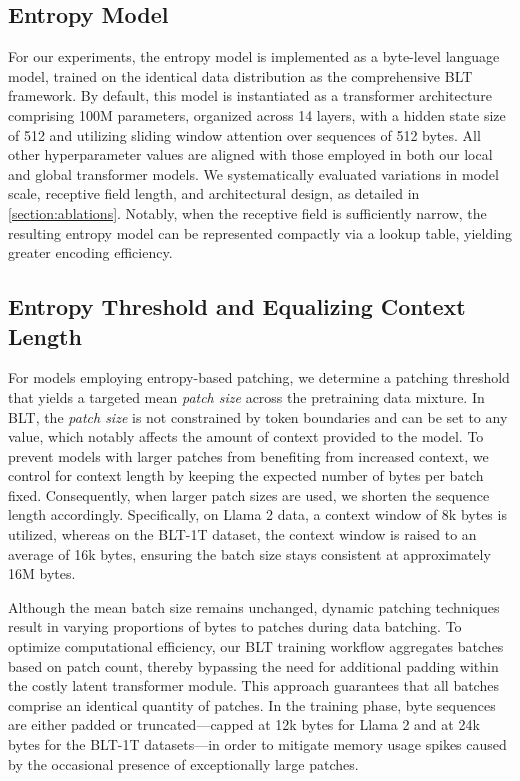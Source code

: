 \subsection{Entropy Model} For our experiments, the entropy model is implemented as a byte-level language model, trained on the identical data distribution as the comprehensive {\textsc BLT} framework. By default, this model is instantiated as a transformer architecture comprising 100M parameters, organized across 14 layers, with a hidden state size of 512 and utilizing sliding window attention over sequences of 512 bytes. All other hyperparameter values are aligned with those employed in both our local and global transformer models. We systematically evaluated variations in model scale, receptive field length, and architectural design, as detailed in \autoref{section:ablations}. Notably, when the receptive field is sufficiently narrow, the resulting entropy model can be represented compactly via a lookup table, yielding greater encoding efficiency.

\subsection{Entropy Threshold and Equalizing Context Length} For models employing entropy-based patching, we determine a patching threshold that yields a targeted mean \textit{patch size} across the pretraining data mixture. In {\textsc BLT}, the \textit{patch size} is not constrained by token boundaries and can be set to any value, which notably affects the amount of context provided to the model. To prevent models with larger patches from benefiting from increased context, we control for context length by keeping the expected number of bytes per batch fixed. Consequently, when larger patch sizes are used, we shorten the sequence length accordingly. Specifically, on Llama 2 data, a context window of 8k bytes is utilized, whereas on the {\textsc BLT}-1T dataset, the context window is raised to an average of 16k bytes, ensuring the batch size stays consistent at approximately 16M bytes.

Although the mean batch size remains unchanged, dynamic patching techniques result in varying proportions of bytes to patches during data batching. To optimize computational efficiency, our {\textsc BLT} training workflow aggregates batches based on patch count, thereby bypassing the need for additional padding within the costly latent transformer module. This approach guarantees that all batches comprise an identical quantity of patches. In the training phase, byte sequences are either padded or truncated—capped at 12k bytes for Llama 2 and at 24k bytes for the {\textsc BLT}-1T datasets—in order to mitigate memory usage spikes caused by the occasional presence of exceptionally large patches.

